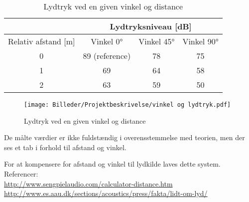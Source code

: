 \begin{table}[H]
	\centering
		\begin{tabular}{|c|c|c|c|}
			\hline
				&\multicolumn{3}{|c|}{Lydtryksniveau [dB]}\\ \hline
				Relativ afstand [m] & Vinkel 0° & Vinkel 45° & Vinkel 90°\\ \hline
				0&	89 (reference)&	78&	75\\ \hline
				1&	69&				64&	58\\ \hline
				2&	63&				59&	50\\ \hline
		\end{tabular}
	\caption{Lydtryk ved en given vinkel og distance}
	\label{tab:lydtryk vs distance og vinkel}
\end{table}

\begin{figure}[h!]
  \centering
    \texttt{[image: Billeder/Projektbeskrivelse/vinkel og lydtryk.pdf]}
    \caption{Lydtryk ved en given vinkel og distance}
\end{figure}\medskip

De målte værdier er ikke fuldstændig i overensstemmelse med teorien, men der ses et tab i forhold til afstand og vinkel.

For at kompensere for afstand og vinkel til lydkilde laves dette system.\\
Referencer:\\
\url{http://www.sengpielaudio.com/calculator-distance.htm}\\
\url{http://www.es.aau.dk/sections/acoustics/press/fakta/lidt-om-lyd/}\\
